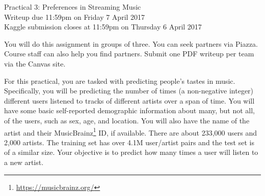 \documentclass[12pt]{article}
\begin{document}
\begin{center}
{\Large Practical 3: Preferences in Streaming Music}\\
Writeup due 11:59pm on Friday 7 April 2017\\
Kaggle submission closes at 11:59pm on Thursday 6 April 2017
\end{center}


You will do this assignment in groups of three. You can seek partners via Piazza.  Course staff can also help you find partners.  Submit one PDF writeup per team via the Canvas site.

For this practical, you are tasked with predicting people's tastes in music. Specifically, you will be predicting the number of times (a non-negative integer) different users listened to tracks of different artists over a span of time.  You will have some basic self-reported demographic information about many, but not all, of the users, such as sex, age, and location.  You will also have the name of the artist and their MusicBrainz\footnote{\url{https://musicbrainz.org/}} ID, if available.  There are about 233,000 users and 2,000 artists.  The training set has over 4.1M user/artist pairs and the test set is of a similar size.  Your objective is to predict how many times a user will listen to a new artist.
\end{document}
